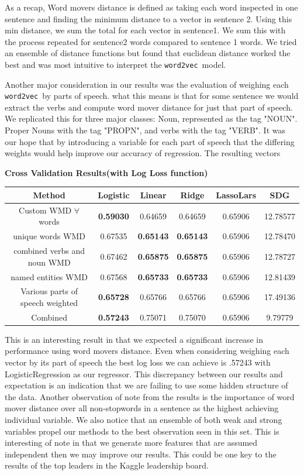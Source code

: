 \documentclass{article} %
\newcommand{\wordtvec}{\texttt{word2vec}}
\begin{document}
As a recap, Word movers distance is defined as taking each word inspected in one sentence and finding the minimum distance to a vector in sentence 2. Using this min distance, we sum the total for each vector in sentence1. We sum this with the process repeated for sentence2 words compared to sentence 1 words. 
 We tried an ensemble of distance functions but found that euclidean distance worked the best and was most intuitive to interpret the \wordtvec\ model. 

Another major consideration in our results was the evaluation of weighing each \wordtvec\ by parts of speech. what this means is that for some sentence we would extract the verbs and compute word mover distance for just that part of speech. We replicated this for three major classes: Noun, represented as the tag "NOUN". Proper Nouns with the tag "PROPN", and verbs with the tag "VERB". 
It was our hope that by introducing a variable for each part of speech that the differing weights would help improve our accuracy of regression. The resulting vectors

\begin{center}
\textbf{Cross Validation Results(with Log Loss function)}

	\begin{tabular}{|c|c|c|c|c|c|} \hline
	Method & Logistic & Linear & Ridge & LassoLars & SDG \\ \hline
	Custom WMD $\forall$ words & \textbf{0.59030} & 0.64659 & 0.64659 & 0.65906 & 12.78577 \\ \hline
	unique words WMD & 0.67535 & \textbf{0.65143} & \textbf{0.65143} & 0.65906 & 12.78470 \\ \hline
	combined verbs and noun WMD & 0.67462 & \textbf{0.65875} & \textbf{0.65875} & 0.65906 & 12.78727 \\ \hline
	named entities WMD & 0.67568 & \textbf{0.65733} & \textbf{0.65733} & 0.65906 & 12.81439 \\ \hline
	Various parts of speech weighted & \textbf{0.65728} & 0.65766 & 0.65766 & 0.65906 & 17.49136\\ \hline
	Combined & \textbf{0.57243} & 0.75071 & 0.75070 & 0.65906 & 9.79779 \\ \hline
	\end{tabular}
\end{center}
This is an interesting result in that we expected a significant increase in performance using word movers distance. Even when considering weighing each vector by its part of speech the best log loss we can achieve is .57243 with LogisticRegression as our regressor. This discrepancy between our results and expectation is an indication that we are failing to use some hidden structure of the data. Another observation of note from the results is the importance of word mover distance over all non-stopwords in a sentence as the highest achieving individual variable. We also notice that an ensemble of both weak and strong variables propel our methods to the best observation seen in this set. This is interesting of note in that we generate more features that are assumed independent then we may improve our results. This could be one key to the results of the top leaders in the Kaggle leadership board.
\end{document}
